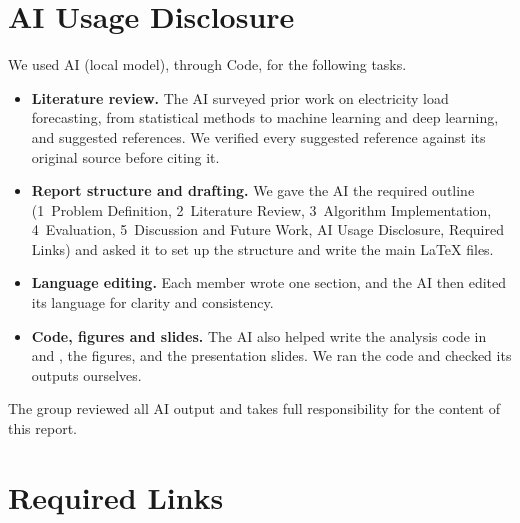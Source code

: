 \section*{AI Usage Disclosure}
\label{sec:ai-disclosure}

We used AI (local model), through Code, for the following tasks.
\begin{itemize}
  \item \textbf{Literature review.} The AI surveyed prior work on electricity load forecasting,
        from statistical methods to machine learning and deep learning, and suggested references.
        We verified every suggested reference against its original source before citing it.
  \item \textbf{Report structure and drafting.} We gave the AI the required outline
        (1~Problem Definition, 2~Literature Review, 3~Algorithm Implementation, 4~Evaluation,
        5~Discussion and Future Work, AI Usage Disclosure, Required Links) and asked it to set up
        the structure and write the main \LaTeX{} files.
  \item \textbf{Language editing.} Each member wrote one section, and the AI then edited its
        language for clarity and consistency.
  \item \textbf{Code, figures and slides.} The AI also helped write the analysis code in
         and , the figures, and the presentation slides. We ran the
        code and checked its outputs ourselves.
\end{itemize}
The group reviewed all AI output and takes full responsibility for the content of this report.


\section*{Required Links}
\label{sec:links}

